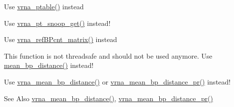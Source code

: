 \begin{DoxyRefList}
\item[\label{deprecated__deprecated000132}%
\hypertarget{deprecated__deprecated000132}{}%
Global \hyperlink{group__struct__utils_ga89c32307ee50a0026f4a3131fac0845a}{make\-\_\-pair\-\_\-table} (const char $\ast$structure)]Use \hyperlink{group__struct__utils_gae829fb8bb7f694c12a9c0bbc34c77c60}{vrna\-\_\-ptable()} instead 
\item[\label{deprecated__deprecated000135}%
\hypertarget{deprecated__deprecated000135}{}%
Global \hyperlink{group__struct__utils_ga9aa3bf3b4346bb7fb88efc154dd07a79}{make\-\_\-pair\-\_\-table\-\_\-snoop} (const char $\ast$structure)]Use \hyperlink{group__struct__utils_gaef0f7e1a6c00c81a349973de53039dda}{vrna\-\_\-pt\-\_\-snoop\-\_\-get()} instead!  
\item[\label{deprecated__deprecated000137}%
\hypertarget{deprecated__deprecated000137}{}%
Global \hyperlink{group__struct__utils_ga578cd9712dee812fb1c58aa3cc489864}{make\-\_\-reference\-B\-P\-\_\-array} (short $\ast$reference\-\_\-pt, unsigned int turn)]Use \hyperlink{group__struct__utils_gab4c2a00c99ce1d612ffa5bde114eb96d}{vrna\-\_\-ref\-B\-Pcnt\-\_\-matrix()} instead  
\item[\label{deprecated__deprecated000106}%
\hypertarget{deprecated__deprecated000106}{}%
Global \hyperlink{part__func_8h_ae9556ba7ded44fe2321b6f67c3fc02a3}{mean\-\_\-bp\-\_\-dist} (int length)]This function is not threadsafe and should not be used anymore. Use \hyperlink{group__pf__fold_ga79cbc375af65f11609feb6b055269e7d}{mean\-\_\-bp\-\_\-distance()} instead!  
\item[\label{deprecated__deprecated000100}%
\hypertarget{deprecated__deprecated000100}{}%
Global \hyperlink{group__pf__fold_ga79cbc375af65f11609feb6b055269e7d}{mean\-\_\-bp\-\_\-distance} (int length)]Use \hyperlink{group__pf__fold_gaa6b8983b559b9ef4b2e1b31113ea317b}{vrna\-\_\-mean\-\_\-bp\-\_\-distance()} or \hyperlink{group__pf__fold_gad3f0c240512e6d43e2e4d4c2076021f5}{vrna\-\_\-mean\-\_\-bp\-\_\-distance\-\_\-pr()} instead! \begin{DoxySeeAlso}{See Also}
\hyperlink{group__pf__fold_gaa6b8983b559b9ef4b2e1b31113ea317b}{vrna\-\_\-mean\-\_\-bp\-\_\-distance()}, \hyperlink{group__pf__fold_gad3f0c240512e6d43e2e4d4c2076021f5}{vrna\-\_\-mean\-\_\-bp\-\_\-distance\-\_\-pr()} 
\end{DoxySeeAlso}


\end{DoxyRefList}

